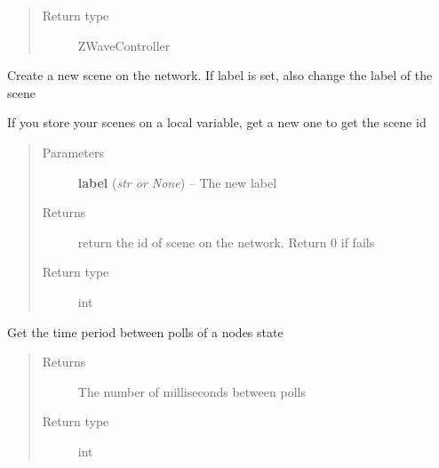 \documentclass[letterpaper,10pt,english]{sphinxmanual}
\begin{document}
\begin{fulllineitems}
\begin{fulllineitems}
\begin{quote}
\begin{description}
\item[{Return type}] \leavevmode
ZWaveController

\end{description}\end{quote}

\end{fulllineitems}


\begin{fulllineitems}
\label{network:openzwave.network.ZWaveNetwork.create_scene}
Create a new scene on the network.
If label is set, also change the label of the scene

If you store your scenes on a local variable, get a new one
to get the scene id
\begin{quote}\begin{description}
\item[{Parameters}] \leavevmode
\textbf{label} (\emph{str or None}) -- The new label

\item[{Returns}] \leavevmode
return the id of scene on the network. Return 0 if fails

\item[{Return type}] \leavevmode
int

\end{description}\end{quote}

\end{fulllineitems}


\begin{fulllineitems}
\label{network:openzwave.network.ZWaveNetwork.get_poll_interval}
Get the time period between polls of a nodes state
\begin{quote}\begin{description}
\item[{Returns}] \leavevmode
The number of milliseconds between polls

\item[{Return type}] \leavevmode
int

\end{description}\end{quote}


\end{fulllineitems}
\end{fulllineitems}
\end{document}
